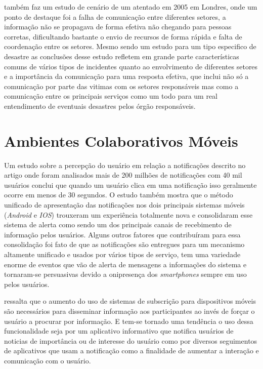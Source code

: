 \documentclass[	12pt, Times, openright, twoside, a4paper, english, brazil]{abntex2}
\begin{document}
\cite{Chen:2016:CCN:2984356.2984368} também faz um estudo de cenário de um atentado em 2005 em Londres, onde um ponto de destaque foi a falha de comunicação entre diferentes setores, a informação não se propagava de forma efetiva não chegando para pessoas corretas, dificultando bastante o envio de recursos de forma rápida e falta de coordenação entre os setores. Mesmo sendo um estudo para um tipo especifico de desastre as conclusões desse estudo refletem em grande parte características comuns de vários tipos de incidentes quanto ao envolvimento de diferentes setores e a importância da comunicação para uma resposta efetiva, que inclui não só a comunicação por parte das vitimas com os setores responsáveis mas como a comunicação entre os principais serviços como um todo para um real entendimento de eventuais desastres pelos órgão responsáveis. 

\section{Ambientes Colaborativos Móveis}

Um estudo sobre a percepção do usuário em relação a notificações descrito no artigo \cite{SahamiShirazi:2014:LAM:2556288.2557189} onde foram analisados mais de 200 milhões de notificações com 40 mil usuários conclui que quando um usuário clica em uma notificação isso geralmente ocorre em menos de 30 segundos. O estudo também mostra que o método unificado de apresentação das notificações nos dois principais sistemas móveis (\textit{Android} e \textit{IOS}) trouxeram um experiência totalmente nova e consolidaram esse sistema de alerta como sendo um dos principais canais de recebimento de informação pelos usuários. Alguns outros fatores que contribuíram para essa consolidação foi fato de que as notificações são entregues para um mecanismo altamente unificado e usados por vários tipos de serviço, tem uma variedade enorme de eventos que vão de alerta de mensagens a informações do sistema e tornaram-se persuasivas devido a onipresença dos \textit{smartphones} sempre em uso pelos usuários.

\cite{Dustdar:2002:ACD:568760.568852} ressalta que o aumento do uso de sistemas de subscrição para dispositivos móveis são necessários para disseminar informação aos participantes ao invés de forçar o usuário a procurar por informação. E tem-se tornado uma tendência o uso dessa funcionalidade seja por um aplicativo informativo que notifica usuários de noticias de importância ou de interesse do usuário como por diversos seguimentos de aplicativos que usam a notificação como a finalidade de aumentar a interação e comunicação com o usuário.
\end{document}
